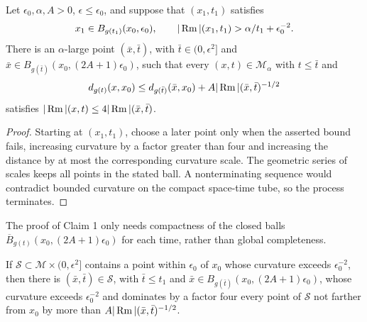 \begin{claim}
\label{clm:chow-iii-point-picking-claim-one}
Let \(\epsilon_0,\alpha,A>0\), \(\epsilon\le\epsilon_0\), and suppose that
\((x_1,t_1)\) satisfies
\[
 x_1\in B_{g(t_1)}(x_0,\epsilon_0),\qquad
 |\operatorname{Rm}|(x_1,t_1)>\alpha/t_1+\epsilon_0^{-2}.
\]
There is an \(\alpha\)-large point \((\bar x,\bar t)\), with
\(\bar t\in(0,\epsilon^2]\) and
\(\bar x\in B_{g(\bar t)}(x_0,(2A+1)\epsilon_0)\), such that every
\((x,t)\in\mathcal M_\alpha\) with \(t\le\bar t\) and
\[
 d_{g(t)}(x,x_0)\le d_{g(\bar t)}(\bar x,x_0)+A|\operatorname{Rm}|(\bar x,\bar t)^{-1/2}
\]
satisfies \(|\operatorname{Rm}|(x,t)\le4|\operatorname{Rm}|(\bar x,\bar t)\).
\end{claim}
\begin{proof}
Starting at \((x_1,t_1)\), choose a later point only when the asserted bound
fails, increasing curvature by a factor greater than four and increasing the
distance by at most the corresponding curvature scale.  The geometric series
of scales keeps all points in the stated ball.  A nonterminating sequence would
contradict bounded curvature on the compact space-time tube, so the process
terminates.
\end{proof}

\begin{remark}
\label{rem:chow-iii-point-picking-compactness}
The proof of Claim 1 only needs compactness of the closed balls
\(\overline B_{g(t)}(x_0,(2A+1)\epsilon_0)\) for each time, rather than global
completeness.
\end{remark}

\begin{lemma}
\label{lem:chow-iii-point-picking-subset}
If \(\mathcal S\subset\mathcal M\times(0,\epsilon^2]\) contains a point within
\(\epsilon_0\) of \(x_0\) whose curvature exceeds \(\epsilon_0^{-2}\), then
there is \((\bar x,\bar t)\in\mathcal S\), with \(\bar t\le t_1\) and
\(\bar x\in B_{g(\bar t)}(x_0,(2A+1)\epsilon_0)\), whose curvature exceeds
\(\epsilon_0^{-2}\) and dominates by a factor four every point of \(\mathcal S\)
not farther from \(x_0\) by more than \(A|\operatorname{Rm}|(\bar x,\bar t)^{-1/2}\).
\end{lemma}

